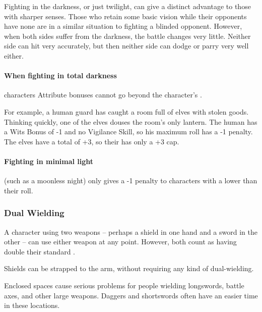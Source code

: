 \begin{multicols}{2}
Fighting in the darkness, or just twilight, can give a distinct advantage to those with sharper senses.
Those who retain some basic vision while their opponents have none are in a similar situation to fighting a blinded opponent.
However, when both sides suffer from the darkness, the battle changes very little.
Neither side can hit very accurately, but then neither side can dodge or parry very well either.

\paragraph*{When fighting in total darkness}
characters Attribute bonuses cannot go beyond the character's .

\begin{exampletext}
  For example, a human guard has caught a room full of elves with stolen goods.
  Thinking quickly, one of the elves douses the room's only lantern.
  The human has a Wits Bonus of -1 and no Vigilance Skill, so his maximum roll has a -1 penalty.
  The elves have a total  of +3, so their  has only a +3 cap.
\end{exampletext}

\paragraph*{Fighting in minimal light}
(such as a moonless night)
only gives a -1 penalty to characters with a  lower than their roll.

\subsubsection[Dual Wielding: Both weapons count has having +1 \glsentrytext{weight}]{Dual Wielding}

A character using two weapons -- perhaps a shield in one hand and a sword in the other -- can use either weapon at any point.
However, both count as having double their standard .

Shields can be strapped to the arm, without requiring any kind of dual-wielding.


Enclosed spaces cause serious problems for people wielding longswords, battle axes, and other large weapons.
Daggers and shortswords often have an easier time in these locations.


\end{multicols}
